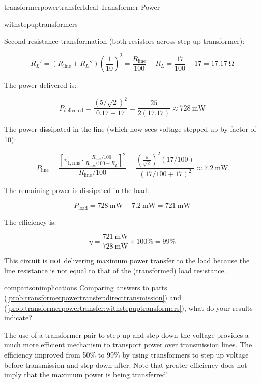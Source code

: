 \begin{mainquestion}{transformerpowertransfer}{Ideal Transformer Power}
\begin{partquestion}{withstepuptransformers}
\begin{answer}
Second resistance transformation (both resistors across step-up transformer):

\[
R_L' = \left(R_{\text{line}} + R_L''\right) \left(\frac{1}{10}\right)^2 = \frac{R_{\text{line}}}{100} + R_L = \frac{17}{100} + 17 = \qty{17.17}{\ohm}
\]

The power delivered is:

\[
P_{\text{delivered}} = \frac{(5/\sqrt{2})^2}{0.17 + 17} = \frac{25}{2(17.17)} \approx \qty{728}{\milli\watt}
\]

The power dissipated in the line (which now sees voltage stepped up by factor of 10):

\[
P_{\text{line}} = \frac{[v_{1,\text{rms}} \cdot \frac{R_{\text{line}}/100}{ R_{\text{line}}/100 + R_L}]^2}{R_{\text{line}}/100} = \frac{(\frac{5}{\sqrt{2}})^2(17/100)}{(17/100 + 17)^2} \approx \qty{7.2}{\milli\watt}
\]

The remaining power is dissipated in the load:

\[
P_{\text{load}} = \qty{728}{\milli\watt} - \qty{7.2}{\milli\watt} = \qty{721}{\milli\watt}
\]

The efficiency is:

\[
\eta = \frac{\qty{721}{\milli\watt}}{\qty{728}{\milli\watt}} \times 100\% = 99\%
\]

This circuit is \textbf{not} delivering maximum power transfer to the load because the line resistance is not equal to that of the (transformed) load
resistance.
\end{answer}
\end{partquestion}

\begin{partquestion}{comparisonimplications}
{Comparing answers to parts (\cref{prob:transformerpowertransfer:directtransmission}) and (\cref{prob:transformerpowertransfer:withstepuptransformers}), what do your results indicate?}

\begin{answer}
The use of a transformer pair to step up and step down the voltage provides a much more efficient mechanism to transport power over transmission lines. The efficiency improved from 50\% to 99\% by using transformers to step up voltage before transmission and step down after. Note that greater efficiency does not imply that the maximum power is being transferred!
\end{answer}
\end{partquestion}


\end{mainquestion}

